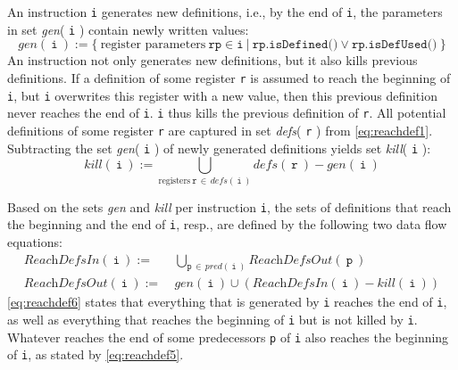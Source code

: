 An instruction \texttt{i} generates new definitions, i.e., by the end of \texttt{i}, the parameters in set \textit{gen}( \texttt{i} ) contain newly written values:
\begin{equation}\label{eq:reachdef3}
  \textit{gen}(\ \texttt{i}\ ) := \{\ \text{register parameters}\ \texttt{rp} \in \texttt{i}\ \vert\ \texttt{rp.isDefined()} \vee \texttt{rp.isDefUsed()}\ \}
\end{equation}
An instruction not only generates new definitions, but it also kills previous definitions.
If a definition of some register \texttt{r} is assumed to reach the beginning of \texttt{i}, but \texttt{i} overwrites this register with a new value, then this previous definition never reaches the end of \texttt{i}. \texttt{i} thus kills the previous definition of \texttt{r}.
All potential definitions of some register \texttt{r} are captured in set \textit{defs}( \texttt{r} ) from \cref{eq:reachdef1}.
Subtracting the set \textit{gen}( \texttt{i} ) of newly generated definitions yields set \textit{kill}( \texttt{i} ):
\begin{equation}\label{eq:reachdef4}
  \textit{kill}(\ \texttt{i}\ ) := \bigcup\limits_{\text{registers}\ \texttt{r}\,\in\,\textit{defs}(\ \texttt{i}\ )} \textit{defs}(\ \texttt{r}\ ) - \textit{gen}(\ \texttt{i}\ )
\end{equation}

Based on the sets \textit{gen} and \textit{kill} per instruction \texttt{i}, the sets of definitions that reach the beginning and the end of \texttt{i}, resp., are defined by the following two data flow equations:
\begin{align}
  \textit{ReachDefsIn}(\ \texttt{i}\ ) :=\ & \bigcup\limits_{\texttt{p}\,\in\,\textit{pred}(\ \texttt{i}\ )} \textit{ReachDefsOut}(\ \texttt{p}\ )\label{eq:reachdef5} \\
  \textit{ReachDefsOut}(\ \texttt{i}\ ) :=\ & \textit{gen}(\ \texttt{i}\ ) \cup (\textit{ReachDefsIn}(\ \texttt{i}\ ) - \textit{kill}(\ \texttt{i}\ ))\label{eq:reachdef6}
\end{align}
\cref{eq:reachdef6} states that everything that is generated by \texttt{i} reaches the end of \texttt{i}, as well as everything that reaches the beginning of \texttt{i} but is not killed by \texttt{i}.
Whatever reaches the end of some predecessors \texttt{p} of \texttt{i} also reaches the beginning of \texttt{i}, as stated by \cref{eq:reachdef5}.

